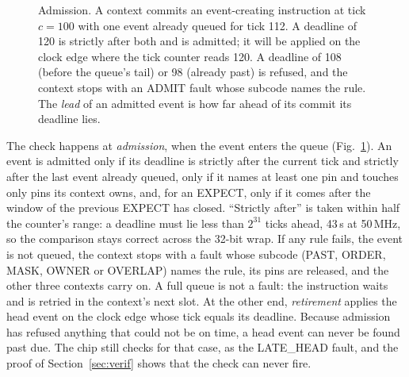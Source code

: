 \documentclass[conference,letterpaper]{IEEEtran}
\begin{document}
\begin{figure}[t]
\centering
{}
\caption{Admission. A context commits an event-creating instruction at tick $c=100$ with
one event already queued for tick 112. A deadline of 120 is strictly after both and is
admitted; it will be applied on the clock edge where the tick counter reads 120. A
deadline of 108 (before the queue's tail) or 98 (already past) is refused, and the
context stops with an ADMIT fault whose subcode names the rule. The \emph{lead} of an
admitted event is how far ahead of its commit its deadline lies.}
\label{fig:admission}
\end{figure}

The check happens at \emph{admission}, when the event enters the queue
(Fig.~\ref{fig:admission}). An event is admitted only if its deadline is strictly after
the current tick and strictly after the last event already queued, only if it names at
least one pin and touches only pins its context owns, and, for an EXPECT, only if it
comes after the window of the previous EXPECT has closed. ``Strictly after'' is taken
within half the counter's range: a deadline must lie less than $2^{31}$ ticks ahead,
43\,s at 50\,MHz, so the comparison stays correct across the 32-bit wrap. If any rule
fails, the event is not queued, the context stops with a fault whose subcode (PAST,
ORDER, MASK, OWNER or OVERLAP) names the rule,
its pins are released, and the other three contexts carry on. A full queue is not a
fault: the instruction waits and is retried in the context's next slot. At the other end,
\emph{retirement} applies the head event on the clock edge whose tick equals its
deadline. Because admission has refused anything that could not be on time, a head event
can never be found past due. The chip still checks for that case, as the LATE\_HEAD
fault, and the proof of Section~\ref{sec:verif} shows that the check can never fire.
\end{document}
